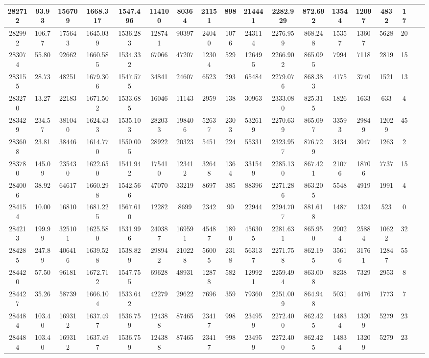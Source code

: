\documentclass[10pt]{extarticle}
\begin{document}
\begin{longtable}{|c|c|c|c|c|c|c|c|c|c|c|c|c|c|c|c|c|c|}
\hline 
282712&93.93&156709&1668.317&1547.496&114100&80364&21151&898&214441&2282.929&872.692&13544&12097&4832&17 \\ 
\hline 
282992&106.77&175643&1645.039&1536.283&128741&90397&24040&1076&243114&2276.959&868.248&15357&13607&5628&20 \\ 
\hline 
283074&55.80&92662&1660.585&1534.332&67066&47207&12304&529&126495&2266.902&865.095&7994&7118&2819&15 \\ 
\hline 
283155&28.73&48251&1679.306&1547.575&34841&24607&6523&293&65484&2279.076&868.383&4175&3740&1521&13 \\ 
\hline 
283270&13.27&22183&1671.502&1533.685&16046&11143&2959&138&30963&2333.080&825.315&1826&1633&633&4 \\ 
\hline 
283429&234.57&381040&1624.433&1535.103&282033&198406&52637&2303&532619&2270.639&865.097&33593&29849&12029&45 \\ 
\hline 
283608&23.81&38446&1614.770&1550.005&28922&20323&5451&224&55331&2323.957&876.729&3434&3047&1263&2 \\ 
\hline 
283780&145.09&235430&1622.650&1541.942&175410&123412&32648&1364&331549&2285.130&867.421&21076&18706&7737&15 \\ 
\hline 
284006&38.92&64617&1660.298&1542.566&47070&33219&8697&385&88396&2271.286&863.205&5548&4919&1991&4 \\ 
\hline 
284154&10.00&16810&1681.225&1567.610&12282&8699&2342&90&22944&2294.707&881.618&1487&1324&523&0 \\ 
\hline 
284213&199.99&325101&1625.580&1531.996&240387&169591&45487&1890&456305&2281.631&865.950&29024&25884&10622&32 \\ 
\hline 
284285&247.89&406416&1639.528&1538.829&298942&210228&56005&2318&563137&2271.758&862.195&35616&31761&12847&55 \\ 
\hline 
284420&57.50&96181&1672.712&1547.755&69628&48931&12878&582&129921&2259.494&863.008&8238&7329&2953&8 \\ 
\hline 
284427&35.26&58739&1666.104&1533.642&42279&29622&7696&359&79360&2251.009&864.948&5031&4476&1773&7 \\ 
\hline 
284484&103.40&169312&1637.497&1536.759&124388&87465&23417&998&234959&2272.400&862.425&14834&13209&5279&23 \\ 
\hline 
284484&103.40&169312&1637.497&1536.759&124388&87465&23417&998&234959&2272.400&862.425&14834&13209&5279&23 \\ 
\hline 
\end{longtable} 
\end{document}
